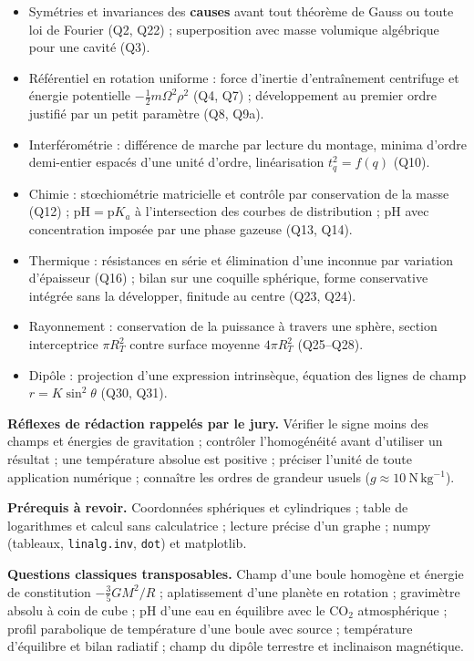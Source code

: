 \documentclass[11pt,a4paper]{article}
\providecommand{\tightlist}{\setlength{\itemsep}{0pt}\setlength{\parskip}{0pt}}
\begin{document}
\begin{itemize}
\tightlist
\item
  Symétries et invariances des \textbf{causes} avant tout théorème de Gauss ou toute loi de Fourier (Q2, Q22) ; superposition avec masse volumique algébrique pour une cavité (Q3).
\item
  Référentiel en rotation uniforme : force d'inertie d'entraînement centrifuge et énergie potentielle \(-\frac12m\Omega^2\rho^2\) (Q4, Q7) ; développement au premier ordre justifié par un petit paramètre (Q8, Q9a).
\item
  Interférométrie : différence de marche par lecture du montage, minima d'ordre demi-entier espacés d'une unité d'ordre, linéarisation \(t_q^2=f(q)\) (Q10).
\item
  Chimie : stœchiométrie matricielle et contrôle par conservation de la masse (Q12) ; \(\mathrm{pH}=\mathrm pK_a\) à l'intersection des courbes de distribution ; pH avec concentration imposée par une phase gazeuse (Q13, Q14).
\item
  Thermique : résistances en série et élimination d'une inconnue par variation d'épaisseur (Q16) ; bilan sur une coquille sphérique, forme conservative intégrée sans la développer, finitude au centre (Q23, Q24).
\item
  Rayonnement : conservation de la puissance à travers une sphère, section interceptrice \(\pi R_T^2\) contre surface moyenne \(4\pi R_T^2\) (Q25--Q28).
\item
  Dipôle : projection d'une expression intrinsèque, équation des lignes de champ \(r=K\sin^2\theta\) (Q30, Q31).
\end{itemize}

\textbf{Réflexes de rédaction rappelés par le jury.} Vérifier le signe moins des champs et énergies de gravitation ; contrôler l'homogénéité avant d'utiliser un résultat ; une température absolue est positive ; préciser l'unité de toute application numérique ; connaître les ordres de grandeur usuels (\(g\approx10\ \mathrm{N\,kg^{-1}}\)).

\textbf{Prérequis à revoir.} Coordonnées sphériques et cylindriques ; table de logarithmes et calcul sans calculatrice ; lecture précise d'un graphe ; numpy (tableaux, \texttt{linalg.inv}, \texttt{dot}) et matplotlib.

\textbf{Questions classiques transposables.} Champ d'une boule homogène et énergie de constitution \(-\frac35GM^2/R\) ; aplatissement d'une planète en rotation ; gravimètre absolu à coin de cube ; pH d'une eau en équilibre avec le \(\mathrm{CO_2}\) atmosphérique ; profil parabolique de température d'une boule avec source ; température d'équilibre et bilan radiatif ; champ du dipôle terrestre et inclinaison magnétique.
\end{document}
